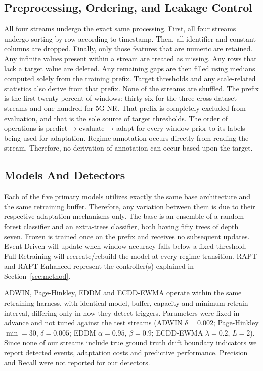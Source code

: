 \documentclass[conference]{IEEEtran}
\begin{document}
\subsection{Preprocessing, Ordering, and Leakage Control} 
All four streams undergo the exact same processing. First, all four streams undergo sorting by row according to timestamp. Then, all identifier and constant columns are dropped. Finally, only those features that are numeric are retained. Any infinite values present within a stream are treated as missing. Any rows that lack a target value are deleted. Any remaining gaps are then filled using medians computed solely from the training prefix. Target thresholds and any scale-related statistics also derive from that prefix. None of the streams are shuffled. The prefix is the first twenty percent of windows: thirty-six for the three cross-dataset streams and one hundred for 5G NR. That prefix is completely excluded from evaluation, and that is the sole source of target thresholds. The order of operations is predict → evaluate → adapt for every window prior to its labels being used for adaptation. Regime annotation occurs directly from reading the stream. Therefore, no derivation of annotation can occur based upon the target.


\subsection{Models And Detectors} 
Each of the five primary models utilizes exactly the same base architecture and the same retraining buffer. Therefore, any variation between them is due to their respective adaptation mechanisms only. The base is an ensemble of a random forest classifier and an extra-trees classifier, both having fifty trees of depth seven. Frozen is trained once on the prefix and receives no subsequent updates. Event-Driven will update when window accuracy falls below a fixed threshold. Full Retraining will recreate/rebuild the model at every regime transition. RAPT and RAPT-Enhanced represent the controller(s) explained in Section~\ref{sec:method}.


ADWIN, Page-Hinkley, EDDM and ECDD-EWMA operate within the same retraining harness, with identical model, buffer, capacity and minimum-retrain-interval, differing only in how they detect triggers. Parameters were fixed in advance and not tuned against the test streams (ADWIN $\delta=0.002$; Page-Hinkley $\min=30$, $\delta=0.005$; EDDM $\alpha=0.95$, $\beta=0.9$; ECDD-EWMA $\lambda=0.2$, $L=2$). Since none of our streams include true ground truth drift boundary indicators we report detected events, adaptation costs and predictive performance. Precision and Recall were not reported for our detectors.
\end{document}
